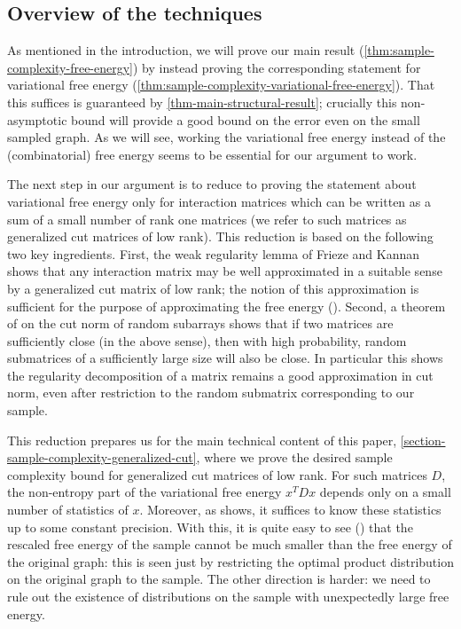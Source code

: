 \documentclass[final, 12pt]{colt2018}
\theoremstyle{definition}
\theoremstyle{plain}
\begin{document}
\subsection{Overview of the techniques}
As mentioned in the introduction, we will prove our main result (\cref{thm:sample-complexity-free-energy}) by instead proving the corresponding statement for variational free energy (\cref{thm:sample-complexity-variational-free-energy}). That this suffices is guaranteed by \cref{thm-main-structural-result}; crucially this non-asymptotic bound will provide a good bound on the error even on the small sampled graph. As we will see, working the variational free energy instead of the (combinatorial) free energy seems to be essential for our argument to work.

The next step in our argument is to reduce to proving the statement about variational free energy only for interaction matrices which can be written as a sum of a small number of rank one matrices (we refer to such matrices as generalized cut matrices of low rank). This reduction is based on the following two key ingredients. First, the weak regularity lemma of Frieze and Kannan shows that any interaction matrix may be well approximated in a suitable sense by a generalized cut matrix of low rank;  the notion of this approximation is sufficient for the purpose of approximating the free energy (). Second, a theorem of \citep{alon-etal-samplingCSP} on the cut norm of random subarrays shows that if two matrices are sufficiently close (in the above sense), then with high probability, random submatrices of a sufficiently large size will also be close. In particular this shows the regularity decomposition of a matrix remains a good approximation in cut norm, even after restriction to the random submatrix corresponding to our sample.

This reduction prepares us for the main technical content of this paper, \cref{section-sample-complexity-generalized-cut}, where we prove the desired sample complexity bound for generalized cut matrices of low rank. For such matrices $D$, the non-entropy part of the variational free energy $x^T D x$ depends only on a small number of statistics of $x$. Moreover, as  shows, it suffices to know these statistics up to some constant precision. With this, it is quite easy to see () that the rescaled free energy of the sample cannot be much smaller than the free energy of the original graph: this is seen just by restricting
the optimal product distribution on the original graph to the sample. The other direction is harder: we need to rule out the existence of distributions on the sample with unexpectedly large free energy. 
\end{document}
